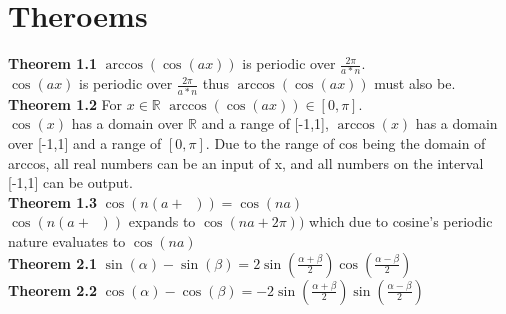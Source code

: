 \documentclass[11pt]{article}
\DeclareMathOperator{\period}{\frac{2\pi}{n}}
\begin{document}
\section{Theroems}
\textbf{Theorem 1.1} \(\arccos(\cos(ax))\) is periodic over \(\frac{2\pi}{a*n}\).\\
\(\cos(ax)\) is periodic over \(\frac{2\pi}{a*n}\) thus \(\arccos(\cos(ax))\) must also be.\\
\textbf{Theorem 1.2} For \(x\in\mathbb{R}\) \(\arccos(\cos(ax))\in[0,\pi]\).\\
\(\cos(x)\) has a domain over \(\mathbb{R}\) and a range of [-1,1], \(\arccos(x)\) has a domain over [-1,1] and a range of \([0,\pi]\). Due to the range of cos being the domain of arccos, all real numbers can be an input of x, and all numbers on the interval [-1,1] can be output.\\
\textbf{Theorem 1.3} \(\cos(n(a+\period))=\cos(na)\)\\
\(\cos(n(a+\period))\) expands to \(\cos(na+2\pi))\) which due to cosine's periodic nature evaluates to \(\cos(na)\)\\
\textbf{Theorem 2.1} \(\sin(\alpha)-\sin(\beta)=2\sin(\frac{\alpha+\beta}{2})\cos(\frac{\alpha-\beta}{2})\)\\
\textbf{Theorem 2.2} \(\cos(\alpha)-\cos(\beta)=-2\sin(\frac{\alpha+\beta}{2})\sin(\frac{\alpha-\beta}{2})\)


\pagebreak
\end{document}
